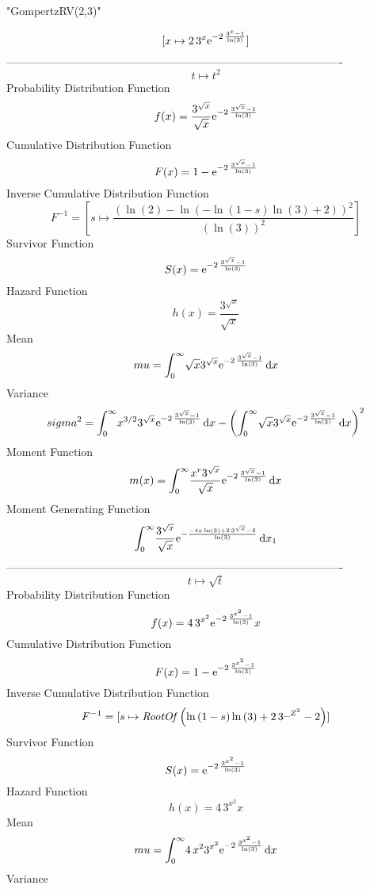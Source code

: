 \documentclass[12pt]{article}
\begin{document}
 
                              "GompertzRV(2,3)"

$$[x\mapsto 2\,{3}^{x}{{\rm e}^{-2\,{\frac {{3}^{x}-1}{\ln  \left( 3
 \right) }}}}]
$$-------------------------------------------------------------------------------------------  \\$$t\mapsto {t}^{2}
$$Probability Distribution Function 
$$  f(x)={\frac {{3}^{\sqrt {x}}}{\sqrt {x}}{{\rm e}^{-2\,{\frac {{3}^{\sqrt {x
}}-1}{\ln  \left( 3 \right) }}}}}
$$Cumulative Distribution Function  
 $$F(x)=1-{{\rm e}^{-2\,{\frac {{3}^{\sqrt {x}}-1}{\ln  \left( 3 \right) }}}}
$$ Inverse Cumulative Distribution Function 
  $$F^{-1} = [s\mapsto {\frac { \left( \ln  \left( 2 \right) -\ln  \left( -\ln 
 \left( 1-s \right) \ln  \left( 3 \right) +2 \right)  \right) ^{2}}{
 \left( \ln  \left( 3 \right)  \right) ^{2}}}]
$$Survivor Function 
 $$ S(x)={{\rm e}^{-2\,{\frac {{3}^{\sqrt {x}}-1}{\ln  \left( 3 \right) }}}}
$$ Hazard Function 
 $$ h(x)={\frac {{3}^{\sqrt {x}}}{\sqrt {x}}}
$$Mean 
 $$ mu=\int_{0}^{\infty }\!\sqrt {x}{3}^{\sqrt {x}}{{\rm e}^{-2\,{\frac {{3}^
{\sqrt {x}}-1}{\ln  \left( 3 \right) }}}}\,{\rm d}x
$$ Variance 
 $$ sigma^2 = \int_{0}^{\infty }\!{x}^{3/2}{3}^{\sqrt {x}}{{\rm e}^{-2\,{\frac {{3}^
{\sqrt {x}}-1}{\ln  \left( 3 \right) }}}}\,{\rm d}x- \left( \int_{0}^{
\infty }\!\sqrt {x}{3}^{\sqrt {x}}{{\rm e}^{-2\,{\frac {{3}^{\sqrt {x}
}-1}{\ln  \left( 3 \right) }}}}\,{\rm d}x \right) ^{2}
$$Moment Function 
 $$ m(x) = \int_{0}^{\infty }\!{\frac {{x}^{r}{3}^{\sqrt {x}}}{\sqrt {x}}{{\rm e}
^{-2\,{\frac {{3}^{\sqrt {x}}-1}{\ln  \left( 3 \right) }}}}}\,{\rm d}x
$$ Moment Generating Function 
 $$\int_{0}^{\infty }\!{\frac {{3}^{\sqrt {x}}}{\sqrt {x}}{{\rm e}^{-{
\frac {-tx\ln  \left( 3 \right) +2\,{3}^{\sqrt {x}}-2}{\ln  \left( 3
 \right) }}}}}\,{\rm d}x_{{1}}
$$-------------------------------------------------------------------------------------------  \\$$t\mapsto \sqrt {t}
$$Probability Distribution Function 
$$  f(x)=4\,{3}^{{x}^{2}}{{\rm e}^{-2\,{\frac {{3}^{{x}^{2}}-1}{\ln  \left( 3
 \right) }}}}x
$$Cumulative Distribution Function  
 $$F(x)=1-{{\rm e}^{-2\,{\frac {{3}^{{x}^{2}}-1}{\ln  \left( 3 \right) }}}}
$$ Inverse Cumulative Distribution Function 
  $$F^{-1} = [s\mapsto {\it RootOf} \left( \ln  \left( 1-s \right) \ln  \left( 3
 \right) +2\,{3}^{{{\it \_Z}}^{2}}-2 \right) ]
$$Survivor Function 
 $$ S(x)={{\rm e}^{-2\,{\frac {{3}^{{x}^{2}}-1}{\ln  \left( 3 \right) }}}}
$$ Hazard Function 
 $$ h(x)=4\,{3}^{{x}^{2}}x
$$Mean 
 $$ mu=\int_{0}^{\infty }\!4\,{x}^{2}{3}^{{x}^{2}}{{\rm e}^{-2\,{\frac {{3}^{
{x}^{2}}-1}{\ln  \left( 3 \right) }}}}\,{\rm d}x
$$ Variance 
\end{document}
